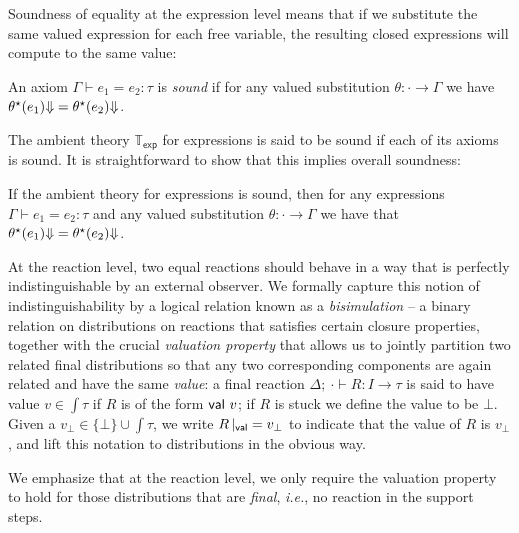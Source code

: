 Soundness of equality at the expression level means that if we substitute the same valued expression for each free variable, the resulting closed expressions will compute to the same value:

\begin{definition}
An axiom $\Gamma \vdash e_1 = e_2 : \tau$ is \emph{sound} if for any valued substitution $\theta : \cdot \to \Gamma$ we have ${\theta^\star(e_1) \hspace{-2.5pt} \Downarrow} = {\theta^\star(e_2) \hspace{-2.5pt} \Downarrow}$.
\end{definition}

\noindent The ambient \ipdl theory $\mathbb{T}_\mathsf{exp}$ for expressions is said to be sound if each of its axioms is sound. It is straightforward to show that this implies overall soundness:
 
\begin{lemma}
If the ambient \ipdl theory for expressions is sound, then for any expressions $\Gamma \vdash e_1 = e_2 : \tau$ and any valued substitution $\theta : \cdot \to \Gamma$ we have that ${\theta^\star(e_1) \hspace{-2.5pt} \Downarrow} = {\theta^\star(e_2) \hspace{-2.5pt} \Downarrow}$.
\end{lemma}

At the reaction level, two equal reactions should behave in a way that is perfectly indistinguishable by an external observer. We formally capture this notion of indistinguishability by a logical relation known as a \emph{bisimulation} -- a binary relation on distributions on reactions that satisfies certain closure properties, together with the crucial \emph{valuation property} that allows us to jointly partition two related final distributions so that any two corresponding components are again related and have the same \emph{value}: a final reaction $\Delta; \ \cdot \vdash R : I \to \tau$ is said to have value $v \in \int{\tau}$ if $R$ is of the form $\mathsf{val} \ v$; if $R$ is stuck we define the value to be $\bot$. Given a $v_\bot \in \{\bot\} \cup \int{\tau}$, we write $R \, |_{\mathsf{val}} = v_\bot$ to indicate that the value of $R$ is $v_\bot$, and lift this notation to distributions in the obvious way.

We emphasize that at the reaction level, we only require the valuation property to hold for those distributions that are \emph{final}, \emph{i.e.}, no reaction in the support steps.

